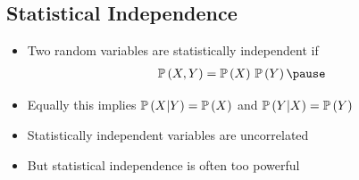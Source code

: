 
\begin{slide}
\section{Statistical Independence}

\begin{PauseHighLight}
  \begin{itemize}
  \item Two random variables are statistically independent if
    \begin{align*}
      \Prob{X,Y} = \Prob{X} \, \Prob{Y}\pause
    \end{align*}
  \item Equally this implies $\mathbb{P}\left( X|Y \right) = \mathbb{P}\left( X \right)$ and $\mathbb{P}\left( Y|X \right) =
    \mathbb{P}\left( Y \right)$\pause
  \item Statistically independent variables are uncorrelated\pause
  \item But statistical independence is often too powerful\pause
  \end{itemize}
\end{PauseHighLight}

\end{slide}


